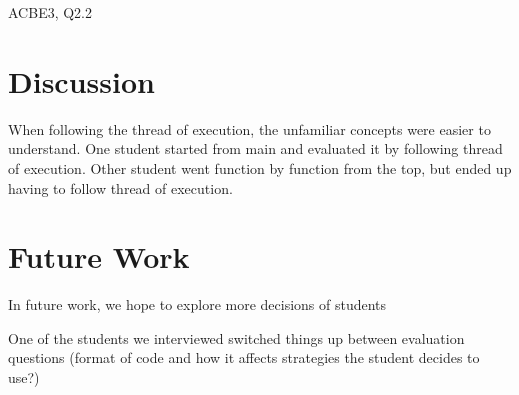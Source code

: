 \documentclass{article}
\begin{document}
ACBE3, Q2.2 

\section{Discussion}
When following the thread of execution, the unfamiliar concepts were easier to understand. 
One student started from main and evaluated it by following thread of execution. Other student went function by function from the top, but ended up having to follow thread of execution. 

\section{Future Work}
In future work, we hope to explore more decisions of students 

One of the students we interviewed switched things up between evaluation questions (format of code and how it affects strategies the student decides to use?)
\end{document}
